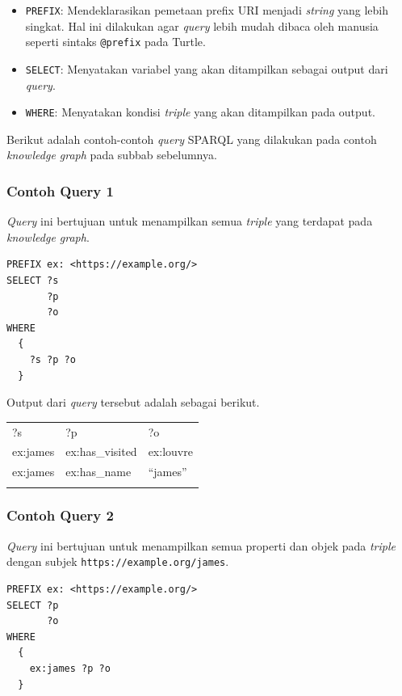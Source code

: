 \begin{itemize}
\itemsep1pt\parskip0pt
\item
  \texttt{PREFIX}: Mendeklarasikan pemetaan prefix URI menjadi
  \emph{string} yang lebih singkat. Hal ini dilakukan agar \emph{query}
  lebih mudah dibaca oleh manusia seperti sintaks \texttt{@prefix} pada
  Turtle.
\item
  \texttt{SELECT}: Menyatakan variabel yang akan ditampilkan sebagai
  output dari \emph{query}.
\item
  \texttt{WHERE}: Menyatakan kondisi \emph{triple} yang akan ditampilkan
  pada output.
\end{itemize}

Berikut adalah contoh-contoh \emph{query} SPARQL yang dilakukan pada
contoh \emph{knowledge graph} pada subbab sebelumnya.

\subsubsection{Contoh Query 1}\label{contoh-query-1}

\emph{Query} ini bertujuan untuk menampilkan semua \emph{triple} yang
terdapat pada \emph{knowledge graph}.

\begin{verbatim}
PREFIX ex: <https://example.org/>
SELECT ?s 
       ?p
       ?o
WHERE
  {
    ?s ?p ?o
  }
\end{verbatim}

Output dari \emph{query} tersebut adalah sebagai berikut.

\begin{longtable}[c]{@{}lll@{}}
\toprule\addlinespace
?s & ?p & ?o
\\\addlinespace
\midrule\endhead
ex:james & ex:has\_visited & ex:louvre
\\\addlinespace
ex:james & ex:has\_name & ``james''
\\\addlinespace
\bottomrule
\end{longtable}

\subsubsection{Contoh Query 2}\label{contoh-query-2}

\emph{Query} ini bertujuan untuk menampilkan semua properti dan objek
pada \emph{triple} dengan subjek \texttt{https://example.org/james}.

\begin{verbatim}
PREFIX ex: <https://example.org/>
SELECT ?p
       ?o
WHERE
  {
    ex:james ?p ?o
  }
\end{verbatim}

